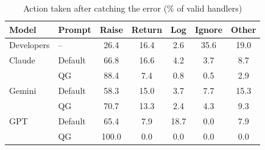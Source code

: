 \begin{table}[t]
  \centering
  \footnotesize
  \setlength{\tabcolsep}{2.5pt}
  \caption{Action taken after catching the error (\% of valid handlers)}
  \label{tab:rq2}
  \begin{tabular}{llccccc}
    \toprule
    Model & Prompt & Raise & Return & Log & Ignore & Other \\
    \midrule
    Developers & -- & 26.4 & 16.4 & 2.6 & 35.6 & 19.0 \\
    \midrule
    Claude & Default & 66.8 & 16.6 & 4.2 & 3.7 & 8.7 \\
     & QG & 88.4 & 7.4 & 0.8 & 0.5 & 2.9 \\
    Gemini & Default & 58.3 & 15.0 & 3.7 & 7.7 & 15.3 \\
     & QG & 70.7 & 13.3 & 2.4 & 4.3 & 9.3 \\
    GPT & Default & 65.4 & 7.9 & 18.7 & 0.0 & 7.9 \\
     & QG & 100.0 & 0.0 & 0.0 & 0.0 & 0.0 \\
    \bottomrule
  \end{tabular}
\end{table}
